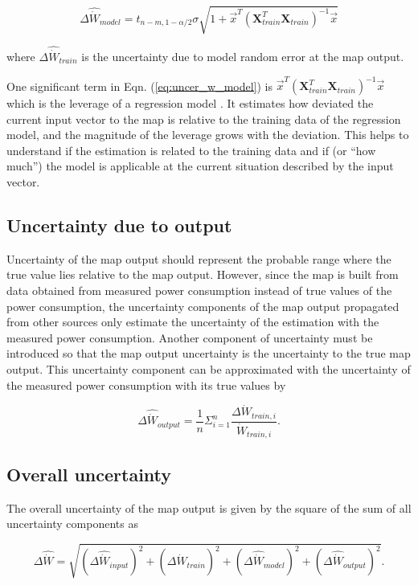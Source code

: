 \begin{equation}
\Delta {\hat{\dot{W}}_{model}} = {t_{n - m,1 - \alpha /2}}\sigma \sqrt {1 + {{\vec x}^T}{{({\mathbf{X}}_{train}^T{{\mathbf{X}}_{train}})}^{ - 1}}\vec x}
\label{eq:uncer_w_model}
\end{equation}

where $\Delta {\hat{\dot{W}}_{train}}$ is the uncertainty due to model random error at the map output.

One significant term in Eqn. (\ref{eq:uncer_w_model}) is ${\vec x^T}{({\mathbf{X}}_{train}^T{{\mathbf{X}}_{train}})^{ - 1}}\vec x$ which is the leverage of a regression model \cite{Atkinson:1987}. It estimates how deviated the current input vector to the map is relative to the training data of the regression model, and the magnitude of the leverage grows with the deviation. This helps to understand if the estimation is related to the training data and if (or ``how much'') the model is applicable at the current situation described by the input vector.

\subsection{Uncertainty due to output} \label{subsec:uncer_output}

Uncertainty of the map output should represent the probable range where the true value lies relative to the map output. However, since the map is built from data obtained from measured power consumption instead of true values of the power consumption, the uncertainty components of the map output propagated from other sources only estimate the uncertainty of the estimation with the measured power consumption. Another component of uncertainty must be introduced so that the map output uncertainty is the uncertainty to the true map output. This uncertainty component can be approximated with the uncertainty of the measured power consumption with its true values by

\begin{equation}
\Delta {\hat{\dot{W}}_{output}} = \frac{1}{n}\Sigma _{i = 1}^n\frac{{\Delta {{\dot{W}}_{train,i}}}}{{{{\dot{W}}_{train,i}}}} .
\label{eq:uncer_w_output}
\end{equation}

\subsection{Overall uncertainty} \label{subsec:overall_uncer}

The overall uncertainty of the map output is given by the square of the sum of all uncertainty components as

\begin{equation}
\Delta \hat{\dot{W}}= \sqrt {{{(\Delta {{\hat{\dot{W}}}_{input}})}^2} + {{(\Delta {{\hat{\dot{W}}}_{train}})}^2} + {{(\Delta {{\hat{\dot{W}}}_{model}})}^2} + {{(\Delta {{\hat{\dot{W}}}_{output}})}^2}} .
\label{eq:overall_uncer}
\end{equation}